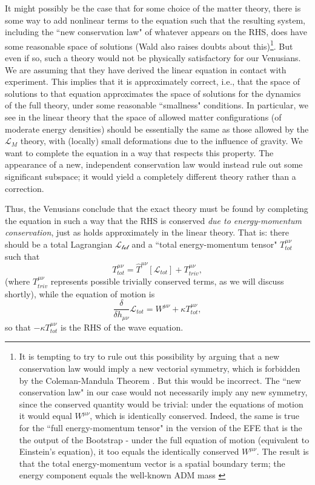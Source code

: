 \documentclass[aps,physrev,preprint,groupedaddress]{revtex4-2}
\begin{document}
It might possibly be the case that for some choice of the matter theory, there is some way to add nonlinear terms to the equation such that the resulting system, including the ``new conservation law" of whatever appears on the RHS, does have some reasonable space of solutions (Wald\cite{Wald} also raises doubts about this)\footnote{It is tempting to try to rule out this possibility by arguing that a new conservation law would imply a new vectorial symmetry, which is forbidden by the Coleman-Mandula Theorem \cite{Coleman-Mandula}. But this would be incorrect. The ``new conservation law" in our case would not necessarily imply any new symmetry, since the conserved quantity would be trivial: under the equations of motion it would equal \(W^{\mu\nu}\), which is identically conserved. Indeed, the same is true for the ``full energy-momentum tensor" in the version of the EFE that is the the output of the Bootstrap - under the full equation of motion (equivalent to Einstein's equation), it too equals the identically conserved \(W^{\mu\nu}\). The result is that the total energy-momentum vector is a spatial boundary term; the energy component equals the well-known ADM mass \cite{ADM}}. But even if so, such a theory would not be physically satisfactory for our Venusians. We are assuming that they have derived the linear equation in contact with experiment. This implies that it is approximately correct, i.e., that the space of solutions to that equation approximates the space of solutions for the dynamics of the full theory, under some reasonable ``smallness" conditions. In particular, we see in the linear theory that the space of allowed matter configurations (of moderate energy densities) should be essentially the same as those allowed by the \(\mathcal{L}_M\) theory, with (locally) small deformations due to the influence of gravity. We want to complete the equation in a way that respects this property. The appearance of a new, independent conservation law would instead rule out some significant subspace; it would yield a completely different theory rather than a correction. 

Thus, the Venusians conclude that the exact theory must be found by completing the equation in such a way that the RHS is conserved \textit{due to energy-momentum conservation}, just as holds approximately in the linear theory. That is: there should be a total Lagrangian \(\mathcal{L_{tot}}\) and a ``total energy-momentum tensor" \(T_{tot}^{\mu\nu}\) such that 
\begin{equation}
T_{tot}^{\mu\nu}={\widehat{T}}^{\mu\nu}\left\lbrack \mathcal{L}_{tot} \right\rbrack+T_{triv}^{\mu\nu},
\end{equation}
(where \(T_{triv}^{\mu\nu}\) represents possible trivially conserved terms, as we will discuss shortly), while the equation of motion is
\begin{equation}
\frac{\delta}{\delta h_{\mu\nu}}\mathcal{L}_{tot}=W^{\mu\nu}+\kappa T_{tot}^{\mu\nu},
\end{equation}
so that \(-\kappa T_{tot}^{\mu\nu}\) is the RHS of the wave equation.
\end{document}

